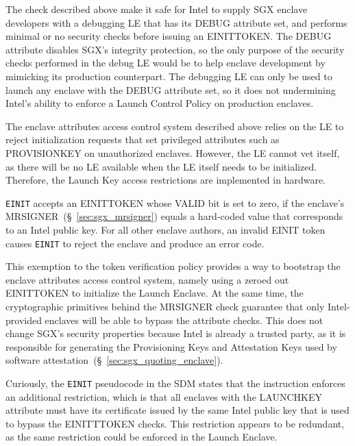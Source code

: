 The check described above make it safe for Intel to supply SGX enclave
developers with a debugging LE that has its DEBUG attribute set, and performs
minimal or no security checks before issuing an EINITTOKEN. The DEBUG attribute
disables SGX's integrity protection, so the only purpose of the security checks
performed in the debug LE would be to help enclave development by mimicking its
production counterpart. The debugging LE can only be used to launch any enclave
with the DEBUG attribute set, so it does not undermining Intel's ability to
enforce a Launch Control Policy on production enclaves.


The enclave attributes access control system described above relies on the LE
to reject initialization requests that set privileged attributes such as
PROVISIONKEY on unauthorized enclaves. However, the LE cannot vet itself, as
there will be no LE available when the LE itself needs to be initialized.
Therefore, the Launch Key access restrictions are implemented in hardware.

\texttt{EINIT} accepts an EINITTOKEN whose VALID bit is set to zero, if
the enclave's MRSIGNER~(\S~\ref{sec:sgx_mrsigner}) equals a hard-coded value
that corresponds to an Intel public key. For all other enclave authors, an
invalid EINIT token causes \texttt{EINIT} to reject the enclave and produce an
error code.

This exemption to the token verification policy provides a way to bootstrap the
enclave attributes access control system, namely using a zeroed out EINITTOKEN
to initialize the Launch Enclave. At the same time, the cryptographic
primitives behind the MRSIGNER check guarantee that only Intel-provided
enclaves will be able to bypass the attribute checks. This does not change
SGX's security properties because Intel is already a trusted party, as it is
responsible for generating the Provisioning Keys and Attestation Keys used by
software attestation~(\S~\ref{sec:sgx_quoting_enclave}).

Curiously, the \texttt{EINIT} pseudocode in the SDM states that the instruction
enforces an additional restriction, which is that all enclaves with the
LAUNCHKEY attribute must have its certificate issued by the same Intel public
key that is used to bypass the EINITTTOKEN checks. This restriction appears to
be redundant, as the same restriction could be enforced in the Launch Enclave.


\label{sec:sgx_licensing}

